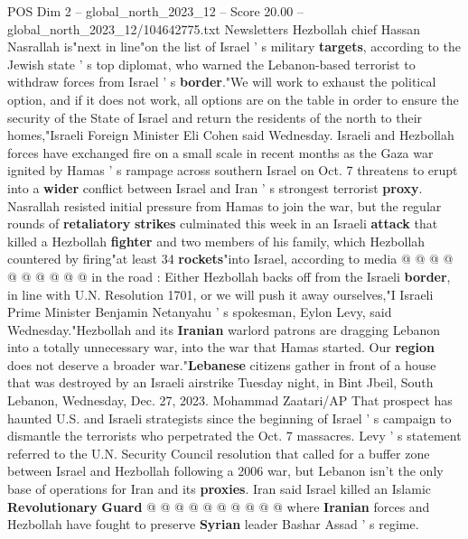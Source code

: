 \begin{textsample}{POS Dim 2 – global\_north\_2023\_12 – Score 20.00 – global\_north\_2023\_12/104642775.txt}  \label{ex:f2_pos_240}
Newsletters Hezbollah chief Hassan Nasrallah is"next in line"on the list of Israel ' s military \textbf{targets}, according to the Jewish state ' s top diplomat, who warned the Lebanon-based terrorist to withdraw forces from Israel ' s \textbf{border}."We will work to exhaust the political option, and if it does not work, all options are on the table in order to ensure the security of the State of Israel and return the residents of the north to their homes,"Israeli Foreign Minister Eli Cohen said Wednesday.
Israeli and Hezbollah forces have exchanged fire on a small scale in recent months as the Gaza war ignited by Hamas ' s rampage across southern Israel on Oct. 7 threatens to erupt into a \textbf{wider} conflict between Israel and Iran ' s strongest terrorist \textbf{proxy}.
Nasrallah resisted initial pressure from Hamas to join the war, but the regular rounds of \textbf{retaliatory} \textbf{strikes} culminated this week in an Israeli \textbf{attack} that killed a Hezbollah \textbf{fighter} and two members of his family, which Hezbollah countered by firing"at least 34 \textbf{rockets}"into Israel, according to media @ @ @ @ @ @ @ @ @ @ in the road : Either Hezbollah backs off from the Israeli \textbf{border}, in line with U.N.
Resolution 1701, or we will push it away ourselves,"I Israeli Prime Minister Benjamin Netanyahu ' s spokesman, Eylon Levy, said Wednesday."Hezbollah and its \textbf{Iranian} warlord patrons are dragging Lebanon into a totally unnecessary war, into the war that Hamas started.
Our \textbf{region} does not deserve a broader war."\textbf{Lebanese} citizens gather in front of a house that was destroyed by an Israeli airstrike Tuesday night, in Bint Jbeil, South Lebanon, Wednesday, Dec. 27, 2023.
Mohammad Zaatari/AP That prospect has haunted U.S. and Israeli strategists since the beginning of Israel ' s campaign to dismantle the terrorists who perpetrated the Oct. 7 massacres.
Levy ' s statement referred to the U.N.
Security Council resolution that called for a buffer zone between Israel and Hezbollah following a 2006 war, but Lebanon isn't the only base of operations for Iran and its \textbf{proxies}.
Iran said Israel killed an Islamic \textbf{Revolutionary} \textbf{Guard} @ @ @ @ @ @ @ @ @ @ where \textbf{Iranian} forces and Hezbollah have fought to preserve \textbf{Syrian} leader Bashar Assad ' s regime.

\end{textsample}
